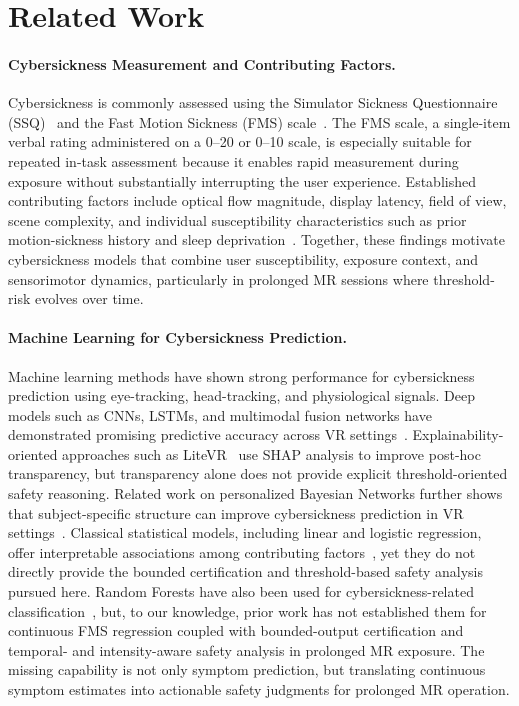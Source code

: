 \documentclass[review]{vgtc}              %
\begin{document}
\section{Related Work}\label{sec:related}

\paragraph{Cybersickness Measurement and Contributing Factors.}
Cybersickness is commonly assessed using the Simulator Sickness Questionnaire (SSQ)~\cite{Kennedy1993SSQ} and the Fast Motion Sickness (FMS) scale~\cite{Keshavarz2011FMS}. The FMS scale, a single-item verbal rating administered on a 0--20 or 0--10 scale, is especially suitable for repeated in-task assessment because it enables rapid measurement during exposure without substantially interrupting the user experience. Established contributing factors include optical flow magnitude, display latency, field of view, scene complexity, and individual susceptibility characteristics such as prior motion-sickness history and sleep deprivation~\cite{Reason1975MotionSickness, Golding1998MSSQ, Stanney1997HumanFactors, LaViola2000Cybersickness, Rebenitsch2016Review}. Together, these findings motivate cybersickness models that combine user susceptibility, exposure context, and sensorimotor dynamics, particularly in prolonged MR sessions where threshold-risk evolves over time.

\paragraph{Machine Learning for Cybersickness Prediction.}
Machine learning methods have shown strong performance for cybersickness prediction using eye-tracking, head-tracking, and physiological signals. Deep models such as CNNs, LSTMs, and multimodal fusion networks have demonstrated promising predictive accuracy across VR settings~\cite{Islam2020DeepCybersickness}. Explainability-oriented approaches such as LiteVR~\cite{LiteVR2023} use SHAP analysis to improve post-hoc transparency, but transparency alone does not provide explicit threshold-oriented safety reasoning. Related work on personalized Bayesian Networks further shows that subject-specific structure can improve cybersickness prediction in VR settings~\cite{Wu:2025:PBN}. Classical statistical models, including linear and logistic regression, offer interpretable associations among contributing factors~\cite{Gavgani2017Profiling, Stauffert2020Latency}, yet they do not directly provide the bounded certification and threshold-based safety analysis pursued here. Random Forests have also been used for cybersickness-related classification~\cite{GarciaAgundez2019Classifier}, but, to our knowledge, prior work has not established them for continuous FMS regression coupled with bounded-output certification and temporal- and intensity-aware safety analysis in prolonged MR exposure. The missing capability is not only symptom prediction, but translating continuous symptom estimates into actionable safety judgments for prolonged MR operation.
\end{document}
